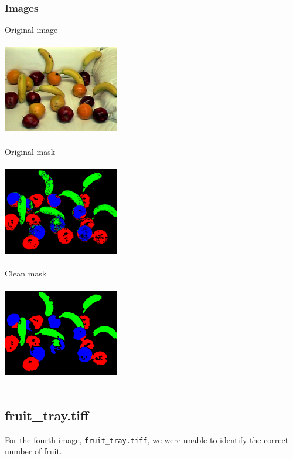 \documentclass{article}
\begin{document}
\subsubsection{Images}
Original image\\~\\
\includegraphics[width=2in]{mixed_fruit3.png}\\~\\
Original mask\\~\\
\includegraphics[width=2in]{mixed_fruit3_step1.png}\\~\\
Clean mask\\~\\
\includegraphics[width=2in]{mixed_fruit3_step2.png}\\~\\

\subsection{fruit\_tray.tiff}
For the fourth image, \texttt{fruit\_tray.tiff}, we were unable to identify the correct number of fruit.
\end{document}
